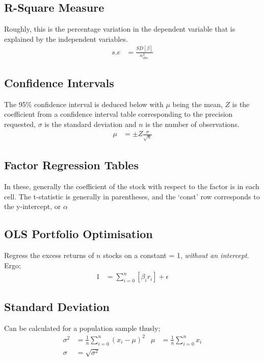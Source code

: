 \documentclass[a4paper]{article}
\begin{document}
\subsection{R-Square Measure}
Roughly, this is the percentage variation in the dependent variable that is
explained by the independent variables.
\begin{align*}
s.e &= \frac{SD[\beta]}{n_{obs.}^2}
\end{align*}

\subsection{Confidence Intervals}
The 95\% confidence interval is deduced below with $\mu$ being the mean, $Z$
is the coefficient from a confidence interval table corresponding to the precision
requested, $\sigma$ is the standard deviation and $n$ is the number of observations.
\begin{align*}
\mu &= \pm Z \frac{\sigma}{\sqrt{n}}
\end{align*}

\subsection{Factor Regression Tables}
In these, generally the coefficient of the stock with respect to the factor
is in each cell. The t-statistic is generally in parentheses, and the `const'
row corresponds to the y-intercept, or $\alpha$


\subsection{OLS Portfolio Optimisation}
Regress the excess returns of $n$ stocks on a constant = 1, \emph{without an
intercept}. Ergo;
\begin{align*}
1 &= \sum_{i = 0}^n [\beta_i r_i] + \epsilon
\end{align*}

\subsection{Standard Deviation}
Can be calculated for a population sample thusly;
\begin{align*}
\sigma^2 &= \frac{1}{n} \sum_{i=0}^{n}(x_i - \mu)^2 & \mu &= \frac{1}{n} \sum_{i=0}^n x_i \\
\sigma &= \sqrt{\sigma^2} & & 
\end{align*}
\end{document}
